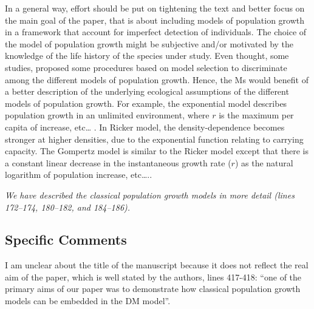 \documentclass[12pt,english]{article}
\begin{document}
\begin{spacing}{1.9}
\begin{flushleft}
In a general way, effort should be put on tightening the text and better focus
on the main goal of the paper, that is about including models of population
growth in a framework that account for imperfect detection of individuals. The
choice of the model of population growth might be subjective and/or motivated by
the knowledge of the life history of the species under study. Even thought, some
studies, proposed some procedures based on model selection to discriminate among
the different models of population growth. Hence, the Ms would benefit of a
better description of the underlying ecological assumptions of the different
models of population growth. For example, the exponential model describes
population growth in an unlimited environment, where $r$ is the maximum per capita
of increase, etc… . In Ricker model, the density-dependence becomes stronger at
higher densities, due to the exponential function relating to carrying capacity.
The Gompertz model is similar to the Ricker model except that there is a
constant linear decrease in the instantaneous growth rate ($r$) as the natural
logarithm of population increase, etc…..

\vspace{0.5cm}
\textit{We have described the classical population growth models in more 
detail (lines 172--174, 180--182, and 184--186).}
\vspace{0.5cm}

\subsection*{Specific Comments}
I am unclear about the title of the manuscript because it does not reflect the real aim of the
paper, which is well stated by the authors, lines 417-418: ``one of the primary aims of our
paper was to demonstrate how classical population growth models can be embedded in the
DM model''.


\end{flushleft}
\end{spacing}
\end{document}
